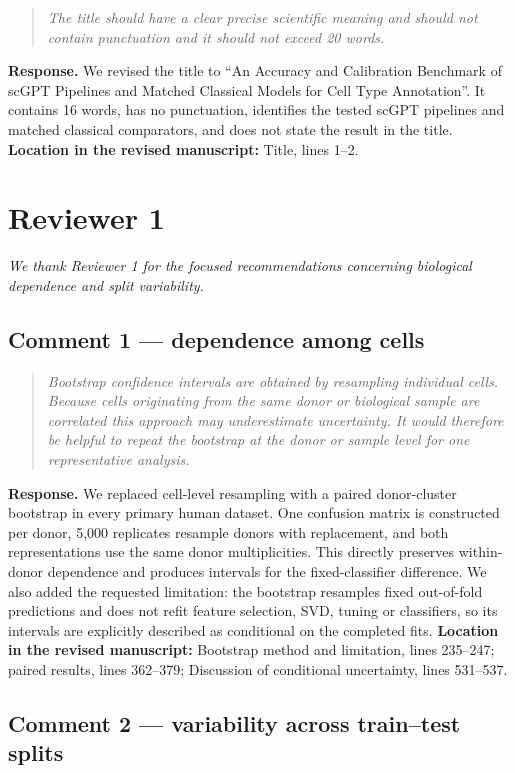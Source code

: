 \documentclass[10pt,a4paper]{article}
\newcommand{\commenttext}[1]{\begin{quote}\colorbox{gray!15}{\parbox{0.91\linewidth}{\itshape #1}}\end{quote}}
\begin{document}
\commenttext{The title should have a clear precise scientific meaning and should not contain punctuation and it should not exceed 20 words.}

\textcolor{responseblue}{\textbf{Response.}} We revised the title to ``An Accuracy and Calibration Benchmark of scGPT Pipelines and Matched Classical Models for Cell Type Annotation''. It contains 16 words, has no punctuation, identifies the tested scGPT pipelines and matched classical comparators, and does not state the result in the title. \textbf{Location in the revised manuscript:} Title, lines 1--2.


\section*{Reviewer 1}

\textit{We thank Reviewer 1 for the focused recommendations concerning biological dependence and split variability.}


\subsection*{Comment 1 --- dependence among cells}

\commenttext{Bootstrap confidence intervals are obtained by resampling individual cells. Because cells originating from the same donor or biological sample are correlated this approach may underestimate uncertainty. It would therefore be helpful to repeat the bootstrap at the donor or sample level for one representative analysis.}

\textcolor{responseblue}{\textbf{Response.}} We replaced cell-level resampling with a paired donor-cluster bootstrap in every primary human dataset. One confusion matrix is constructed per donor, 5,000 replicates resample donors with replacement, and both representations use the same donor multiplicities. This directly preserves within-donor dependence and produces intervals for the fixed-classifier difference. We also added the requested limitation: the bootstrap resamples fixed out-of-fold predictions and does not refit feature selection, SVD, tuning or classifiers, so its intervals are explicitly described as conditional on the completed fits. \textbf{Location in the revised manuscript:} Bootstrap method and limitation, lines 235--247; paired results, lines 362--379; Discussion of conditional uncertainty, lines 531--537.


\subsection*{Comment 2 --- variability across train--test splits}
\end{document}
